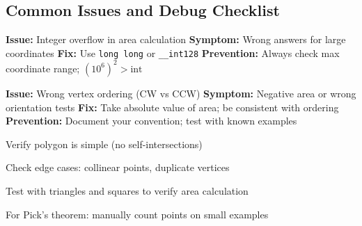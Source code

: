 
\subsection{Common Issues and Debug Checklist}

\begin{gotcha}
\textbf{Issue:} Integer overflow in area calculation
\textbf{Symptom:} Wrong answers for large coordinates
\textbf{Fix:} Use \texttt{long long} or \texttt{\_\_int128}
\textbf{Prevention:} Always check max coordinate range; $(10^6)^2 > \text{int}$
\end{gotcha}

\begin{gotcha}
\textbf{Issue:} Wrong vertex ordering (CW vs CCW)
\textbf{Symptom:} Negative area or wrong orientation tests
\textbf{Fix:} Take absolute value of area; be consistent with ordering
\textbf{Prevention:} Document your convention; test with known examples
\end{gotcha}

\begin{debugchecklist}[Polygons]
\item Verify polygon is simple (no self-intersections)
\item Check edge cases: collinear points, duplicate vertices
\item Test with triangles and squares to verify area calculation
\item For Pick's theorem: manually count points on small examples
\end{debugchecklist} 